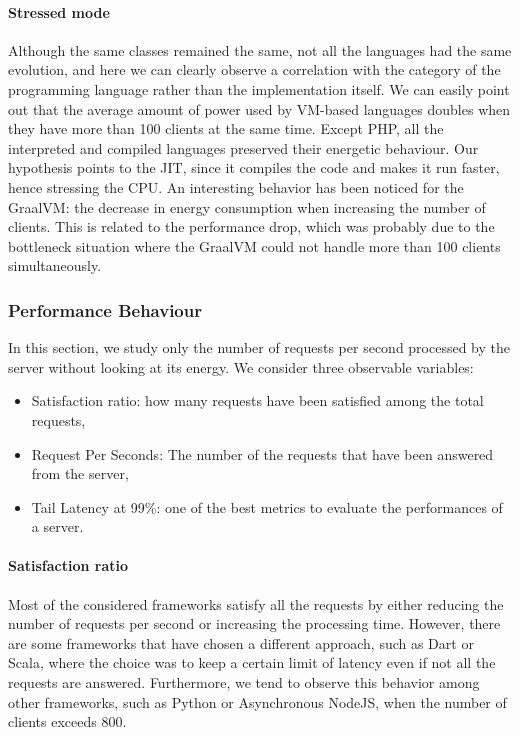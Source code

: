 \paragraph{Stressed mode}
Although the same classes remained the same, not all the languages had the same evolution, and here we can clearly observe a correlation with the category of the programming language rather than the implementation itself.
We can easily point out that the average amount of power used by VM-based languages doubles when they have more than 100 clients at the same time.
Except PHP, all the interpreted and compiled languages preserved their energetic behaviour.
Our hypothesis points to the JIT, since it compiles the code and makes it run faster, hence stressing the CPU.
An interesting behavior has been noticed for the GraalVM: the decrease in energy consumption when increasing the number of clients.
This is related to the performance drop, which was probably due to the bottleneck situation where the GraalVM could not handle more than 100 clients simultaneously.

\subsubsection{Performance Behaviour}
In this section, we study only the number of requests per second processed by the server without looking at its energy.
We consider three observable variables:
\begin{itemize}
    \item \textsf{Satisfaction ratio}: how many requests have been satisfied among the total requests,
    \item \textsf{Request Per Seconds}: The number of the requests that have been answered from the server,
    \item \textsf{Tail Latency at 99\%}: one of the best metrics to evaluate the performances of a server.
\end{itemize}

\paragraph{Satisfaction ratio}
Most of the considered frameworks satisfy all the requests by either reducing the number of requests per second or increasing the processing time.
However, there are some frameworks that have chosen a different approach, such as Dart or Scala, where the choice was to keep a certain limit of latency even if not all the requests are answered.
Furthermore, we tend to observe this behavior among other frameworks, such as Python or Asynchronous NodeJS, when the number of clients exceeds 800.

